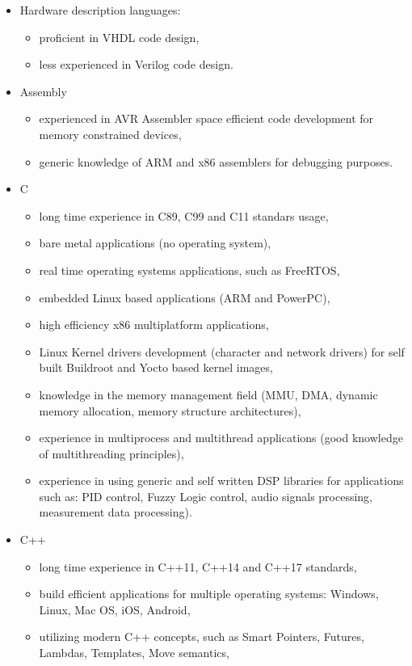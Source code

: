 \documentclass{tccv}
\begin{document}
\begin{itemize}
	\item Hardware description languages:
	\begin{itemize}
		\item proficient in VHDL code design,
		\item less experienced in Verilog code design. 
	\end{itemize}
	\item Assembly
		\begin{itemize}
			\item experienced in AVR Assembler space efficient code development for memory constrained devices,
			\item generic knowledge of ARM and x86 assemblers for debugging purposes.
		\end{itemize}
	\item C
		\begin{itemize}
			\item long time experience in C89, C99 and C11 standars usage,
			\item bare metal applications (no operating system),
			\item real time operating systems applications, such as FreeRTOS,
			\item embedded Linux based applications (ARM and PowerPC),
			\item high efficiency x86 multiplatform applications,
			\item Linux Kernel drivers development (character and network drivers) for self built Buildroot and Yocto based kernel images,
			\item knowledge in the memory management field (MMU, DMA, dynamic memory allocation, memory structure architectures),
			\item experience in multiprocess and multithread applications (good knowledge of multithreading principles),
			\item experience in using generic and self written DSP libraries for applications such as: PID control, Fuzzy Logic control, audio signals processing, measurement data processing).
		\end{itemize}
	\item C++
		\begin{itemize}
			\item long time experience in C++11, C++14 and C++17 standards,
			\item build efficient applications for multiple operating systems: Windows, Linux, Mac OS, iOS, Android,
			\item utilizing modern C++ concepts, such as Smart Pointers, Futures, Lambdas, Templates, Move semantics,

\end{itemize}
\end{itemize}
\end{document}
